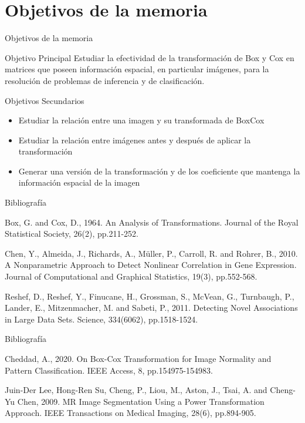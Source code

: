 \documentclass{beamer}
\begin{document}
\section{Objetivos de la memoria}
\begin{frame}{Objetivos de la memoria}
    \begin{block}{Objetivo Principal}
        Estudiar la efectividad de la transformación de Box y Cox en matrices que poseen información espacial, en particular imágenes, para la resolución de problemas de inferencia y de clasificación.
    \end{block}
    \pause
    \begin{block}{Objetivos Secundarios}
        \begin{itemize}
            \item Estudiar la relación entre una imagen y su transformada de BoxCox
            \item Estudiar la relación entre imágenes antes y después de aplicar la transformación
            \item Generar una versión de la transformación y de los coeficiente que mantenga la información espacial de la imagen
        \end{itemize}
    \end{block}
\end{frame}




\begin{frame}{Bibliografía}
    \begin{thebibliography}{9}
    Box, G. and Cox, D., 1964. An Analysis of Transformations. Journal of the Royal Statistical Society, 26(2), pp.211-252.
    
    Chen, Y., Almeida, J., Richards, A., Müller, P., Carroll, R. and Rohrer, B., 2010. A Nonparametric Approach to Detect Nonlinear Correlation in Gene Expression. Journal of Computational and Graphical Statistics, 19(3), pp.552-568.
    
    Reshef, D., Reshef, Y., Finucane, H., Grossman, S., McVean, G., Turnbaugh, P., Lander, E., Mitzenmacher, M. and Sabeti, P., 2011. Detecting Novel Associations in Large Data Sets. Science, 334(6062), pp.1518-1524.
    
    \end{thebibliography}
\end{frame}

\begin{frame}{Bibliografía}
    \begin{thebibliography}{9}
    Cheddad, A., 2020. On Box-Cox Transformation for Image Normality and Pattern Classification. IEEE Access, 8, pp.154975-154983.
    
    Juin-Der Lee, Hong-Ren Su, Cheng, P., Liou, M., Aston, J., Tsai, A. and Cheng-Yu Chen, 2009. MR Image Segmentation Using a Power Transformation Approach. IEEE Transactions on Medical Imaging, 28(6), pp.894-905.
    
    \end{thebibliography}
\end{frame}
\end{document}
